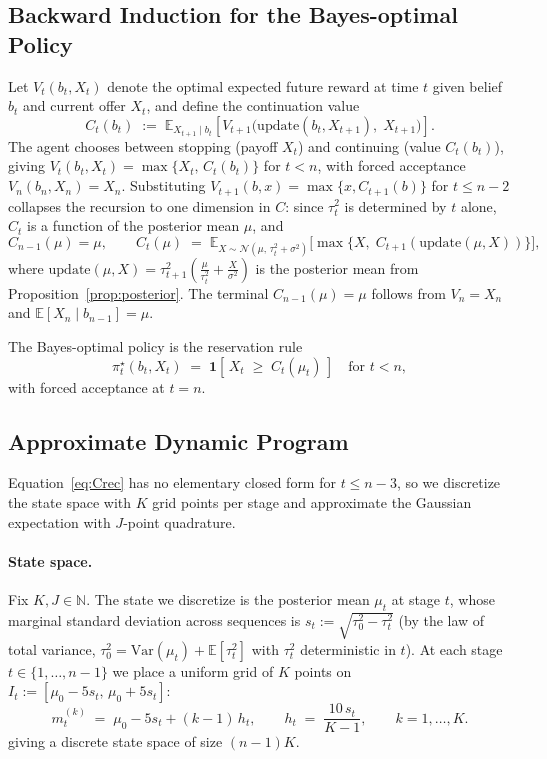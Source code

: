 \documentclass[11pt]{article}
\begin{document}
\subsection{Backward Induction for the Bayes-optimal Policy}
\label{sec:dp}

Let $V_t(b_t, X_t)$ denote the optimal expected future reward at time $t$ given belief $b_t$ and current offer $X_t$, and define the continuation value
\[
C_t(b_t) \;:=\; \mathbb{E}_{X_{t+1} \mid b_t}\!\left[V_{t+1}\big(\mathrm{update}(b_t, X_{t+1}),\; X_{t+1}\big)\right].
\]
The agent chooses between stopping (payoff $X_t$) and continuing (value $C_t(b_t)$), giving $V_t(b_t, X_t) = \max\{X_t,\, C_t(b_t)\}$ for $t < n$, with forced acceptance $V_n(b_n, X_n) = X_n$. Substituting $V_{t+1}(b, x) = \max\{x, C_{t+1}(b)\}$ for $t \le n-2$ collapses the recursion to one dimension in $C$: since $\tau_t^2$ is determined by $t$ alone, $C_t$ is a function of the posterior mean $\mu$, and
\begin{equation}
\label{eq:Crec}
C_{n-1}(\mu) = \mu,
\qquad
C_t(\mu) \;=\; \mathbb{E}_{X \sim \mathcal{N}(\mu,\, \tau_t^2 + \sigma^2)}\!\Big[\max\!\big\{X,\; C_{t+1}(\mathrm{update}(\mu, X))\big\}\Big],
\end{equation}
where $\mathrm{update}(\mu, X) = \tau_{t+1}^2\!\left(\frac{\mu}{\tau_t^2} + \frac{X}{\sigma^2}\right)$ is the posterior mean from Proposition~\ref{prop:posterior}. The terminal $C_{n-1}(\mu) = \mu$ follows from $V_n = X_n$ and $\mathbb{E}[X_n \mid b_{n-1}] = \mu$.

The Bayes-optimal policy is the reservation rule
\[
\pi^\star_t(b_t, X_t) \;=\; \mathbf{1}\!\left[\, X_t \;\ge\; C_t(\mu_t) \,\right]
\quad\text{for } t < n,
\]
with forced acceptance at $t = n$.

\subsection{Approximate Dynamic Program}
\label{sec:adp}

Equation~\eqref{eq:Crec} has no elementary closed form for $t \le n - 3$, so we discretize the state space with $K$ grid points per stage and approximate the Gaussian expectation with $J$-point quadrature.

\paragraph{State space.} Fix $K, J \in \mathbb{N}$. The state we discretize is the posterior mean $\mu_t$ at stage $t$, whose marginal standard deviation across sequences is $s_t := \sqrt{\tau_0^2 - \tau_t^2}$ (by the law of total variance, $\tau_0^2 = \mathrm{Var}(\mu_t) + \mathbb{E}[\tau_t^2]$ with $\tau_t^2$ deterministic in $t$). At each stage $t \in \{1,\ldots,n-1\}$ we place a uniform grid of $K$ points on $I_t := [\mu_0 - 5 s_t,\, \mu_0 + 5 s_t]$:
\[
m_t^{(k)} \;=\; \mu_0 - 5 s_t + (k-1)\,h_t,
\qquad
h_t \;=\; \frac{10\,s_t}{K - 1},
\qquad k = 1,\ldots,K.
\]
giving a discrete state space of size $(n-1)K$.
\end{document}
